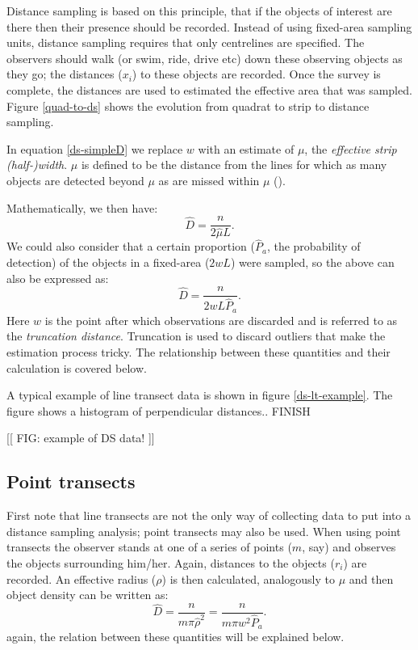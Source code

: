 Distance sampling is based on this principle, that if the objects of interest are there then their presence should be recorded. Instead of using fixed-area sampling units, distance sampling requires that only centrelines are specified. The observers should walk (or swim, ride, drive etc) down these observing objects as they go; the distances ($x_i$) to these objects are recorded. Once the survey is complete, the distances are used to estimated the effective area that was sampled. Figure \ref{quad-to-ds} shows the evolution from quadrat to strip to distance sampling.

In equation \ref{ds-simpleD} we replace $w$ with an estimate of $\mu$, the \textit{effective strip (half-)width}. $\mu$ is defined to be the distance from the lines for which as many objects are detected beyond $\mu$ as are missed within $\mu$ (\cite{eenviron}). 

Mathematically, we then have:
\begin{equation}
\hat{D}=\frac{n}{2\hat{\mu}L}.
\end{equation}
We could also consider that a certain proportion ($\hat{P}_a$, the probability of detection) of the objects in a fixed-area ($2wL$) were sampled, so the above can also be expressed as:
\begin{equation}
\hat{D}=\frac{n}{2wL\hat{P}_a}.
\label{ds-D}
\end{equation}
Here $w$ is the point after which observations are discarded and is referred to as the \textit{truncation distance}. Truncation is used to discard outliers that make the estimation process tricky. The relationship between these quantities and their calculation is covered below.

A typical example of line transect data is shown in figure \ref{ds-lt-example}. The figure shows a histogram of perpendicular distances.. FINISH

[[ FIG: example of DS data! ]]


\subsection{Point transects}
First note that line transects are not the only way of collecting data to put into a distance sampling analysis; point transects may also be used. When using point transects the observer stands at one of a series of points ($m$, say) and observes the objects surrounding him/her. Again, distances to the objects ($r_i$) are recorded. An effective radius ($\rho$) is then calculated, analogously to $\mu$ and then object density can be written as:
\begin{equation}
\hat{D}=\frac{n}{m \pi \hat{\rho}^2}=\frac{n}{m\pi w^2\hat{P}_a}.
\end{equation}
again, the relation between these quantities will be explained below.

